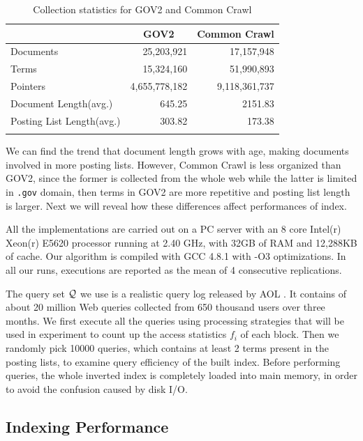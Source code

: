 \documentclass{sig-alternate-05-2015}
\begin{document}
\begin{table}
	\centering
	\caption{Collection statistics for GOV2 and Common Crawl}
	\renewcommand{\arraystretch}{1.0}
	\setlength\tabcolsep{3pt}
	\begin{tabular}{l*{2}{r}}
		\toprule
		& \multicolumn{1}{c}{GOV2} & \multicolumn{1}{c}{Common Crawl} \\
		\midrule
		Documents & 25,203,921 & 17,157,948 \\
		Terms & 15,324,160 & 51,990,893 \\
		Pointers & 4,655,778,182 & 9,118,361,737 \\
		Document Length(avg.) & 645.25 & 2151.83 \\
		Posting List Length(avg.) & 303.82 & 173.38 \\
		\bottomrule
		\label{tab: collection statistics}
	\end{tabular}
\end{table}

We can find the trend that document length grows with age, making documents involved in more posting lists.
However, Common Crawl is less organized than GOV2, since the former is collected from the whole web while the latter is limited in \texttt{.gov} domain, then terms in GOV2 are more repetitive and posting list length is larger.
Next we will reveal how these differences affect performances of index.

All the implementations are carried out on a PC server with an 8 core Intel(r) Xeon(r) E5620 processor running at 2.40 GHz, with 32GB of RAM and 12,288KB of cache. Our algorithm is compiled with GCC 4.8.1 with -O3 optimizations. In all our runs, executions are reported as the mean of 4 consecutive replications.

The query set $ \cal Q $ we use is a realistic query log released by AOL \cite{pass2006picture}.
It contains of about 20 million Web queries collected from 650 thousand users over three months.
We first execute all the queries using processing strategies that will be used in experiment to count up the access statistics $ f_i $ of each block.
Then we randomly pick 10000 queries, which contains at least 2 terms present in the posting lists, to examine query efficiency of the built index.
Before performing queries, the whole inverted index is completely loaded into main memory, in order to avoid the confusion caused by disk I/O.

\subsection{Indexing Performance}
\end{document}
